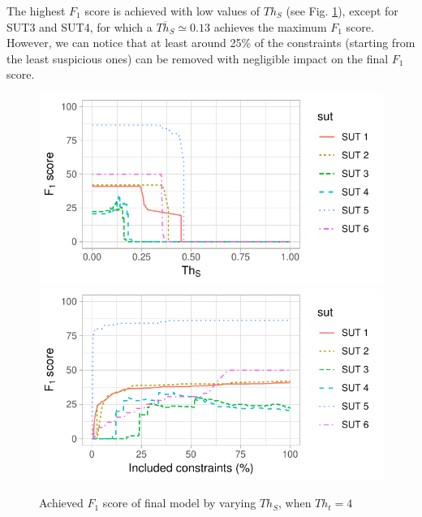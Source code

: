 \begin{tikzborder}{\cite{Gargantini16:validation}}
\begin{tikzborder}{\cite{gargantini_combinatorial_2017}}
\begin{tikzborder}{\cite{gargantini_combinatorial_2017}}
\begin{tikzborder}{\cite{garn2019}}
The highest $F_1$ score is achieved with low values of $Th_S$ (see Fig. \ref{fig:f1ByThs}), except for SUT3 and SUT4, for which a $\overline{Th_S} \simeq 0.13$ achieves the maximum $F_1$ score. However, we can notice that at least around 25\% of the constraints (starting from the least suspicious ones) can be removed with negligible impact on the final $F_1$ score.\be
\begin{figure}[!hbt]
\centering
\includegraphics[width=.49\textwidth]{SUT_4.pdf}
\includegraphics[width=.49\textwidth]{SUT_4_percConstr.pdf}
\caption{Achieved $F_1$ score of final model by varying $Th_S$, when $Th_t=4$
}\label{fig:f1ByThs}
\end{figure}


\end{tikzborder}
\end{tikzborder}
\end{tikzborder}
\end{tikzborder}
